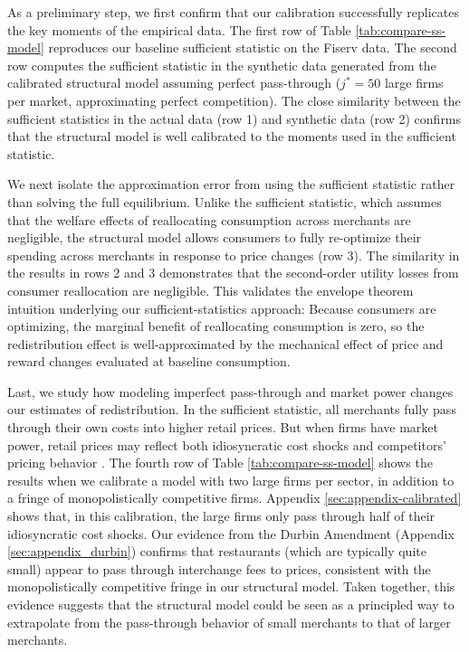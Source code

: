 \documentclass[11pt,english]{article}
\theoremstyle{remark}
\begin{document}
As a preliminary step, we first confirm that our calibration successfully replicates the key moments of the empirical data. The first row of Table \ref{tab:compare-ss-model} reproduces our baseline sufficient statistic on the Fiserv data.
The second row computes the sufficient statistic in the synthetic data generated from the calibrated structural model assuming perfect pass-through ($j^*=50$ large firms per market, approximating perfect competition).
The close similarity between the sufficient statistics in the actual data (row 1) and synthetic data (row 2) confirms that the structural model is well calibrated to the moments used in the sufficient statistic.

We next isolate the approximation error from using the sufficient statistic rather than solving the full equilibrium.
Unlike the sufficient statistic, which assumes that the welfare effects of reallocating consumption across merchants are negligible, the structural model allows consumers to fully re-optimize their spending across merchants in response to price changes (row 3).
The similarity in the results in rows 2 and 3 demonstrates that the second-order utility losses from consumer reallocation are negligible.
This validates the envelope theorem intuition underlying our sufficient-statistics approach: Because consumers are optimizing, the marginal benefit of reallocating consumption is zero, so the redistribution effect is well-approximated by the mechanical effect of price and reward changes evaluated at baseline consumption.

Last, we study how modeling imperfect pass-through and market power changes our estimates of redistribution.
In the sufficient statistic, all merchants fully pass through their own costs into higher retail prices.
But when firms have market power, retail prices may reflect both idiosyncratic cost shocks and competitors' pricing behavior \citep{Amiti.etal2019}.
The fourth row of Table \ref{tab:compare-ss-model} shows the results when we calibrate a model with two large firms per sector, in addition to a fringe of monopolistically competitive firms.
Appendix \ref{sec:appendix-calibrated} shows that, in this calibration, the large firms only pass through half of their idiosyncratic cost shocks.
Our evidence from the Durbin Amendment (Appendix \ref{sec:appendix_durbin}) confirms that restaurants (which are typically quite small) appear to pass through interchange fees to prices, consistent with the monopolistically competitive fringe in our structural model.
Taken together, this evidence suggests that the structural model could be seen as a principled way to extrapolate from the pass-through behavior of small merchants to that of larger merchants.
\end{document}
